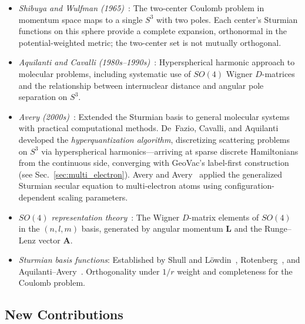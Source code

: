 \documentclass[aps,pra,twocolumn,superscriptaddress,longbibliography]{revtex4-2}
\theoremstyle{remark}
\theoremstyle{plain}
\begin{document}
\begin{itemize}

\item \textit{Shibuya and Wulfman (1965)}~\cite{Shibuya1965}: The
two-center Coulomb problem in momentum space maps to a single $S^3$
with two poles.  Each center's Sturmian functions on this sphere provide a
complete expansion, orthonormal in the potential-weighted metric; the
two-center set is not mutually orthogonal.

\item \textit{Aquilanti and Cavalli
(1980s--1990s)}~\cite{Aquilanti1986,Aquilanti1990}: Hyperspherical
harmonic approach to molecular problems, including systematic use of
$SO(4)$ Wigner $D$-matrices and the relationship between internuclear
distance and angular pole separation on $S^3$.

\item \textit{Avery (2000s)}~\cite{Avery2006}: Extended the Sturmian
basis to general molecular systems with practical computational methods.
De~Fazio, Cavalli, and Aquilanti~\cite{DeFazio2003} developed the
\emph{hyperquantization algorithm}, discretizing scattering problems
on $S^3$ via hyperspherical harmonics---arriving at sparse discrete
Hamiltonians from the continuous side, converging with GeoVac's
label-first construction (see Sec.~\ref{sec:multi_electron}).
Avery and Avery~\cite{Avery2004} applied the generalized Sturmian secular
equation to multi-electron atoms using configuration-dependent
scaling parameters.

\item \textit{$SO(4)$ representation theory}~\cite{Bander1966,%
Biedenharn1981}: The Wigner $D$-matrix elements of $SO(4)$ in the
$(n, l, m)$ basis, generated by angular momentum $\mathbf{L}$ and the
Runge--Lenz vector $\mathbf{A}$.

\item \textit{Sturmian basis functions}: Established by Shull and
L\"owdin~\cite{shull_lowdin}, Rotenberg~\cite{rotenberg}, and
Aquilanti--Avery~\cite{aquilanti_avery,avery_book}.  Orthogonality
under $1/r$ weight and completeness for the Coulomb problem.

\end{itemize}

\subsection{New Contributions}
\end{document}
